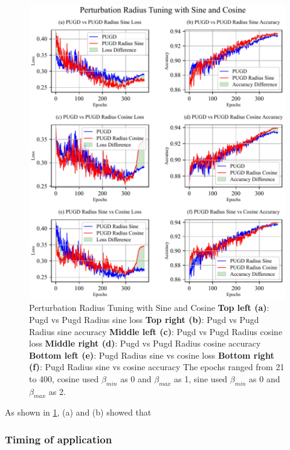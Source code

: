 \documentclass[10pt,twocolumn,letterpaper]{article}
\begin{document}
\begin{figure}[htbp]
	\center
	\vspace{-10pt} 
	\includegraphics[width=\columnwidth]{images/PUGDRadius.pdf}
	\caption{Perturbation Radius Tuning with Sine and Cosine
	\textbf{Top left (a)}: Pugd vs Pugd Radius sine loss \textbf{Top right (b)}: Pugd vs Pugd Radius sine accuracy
    \textbf{Middle left (c)}: Pugd vs Pugd Radius cosine loss \textbf{Middle right (d)}: Pugd vs Pugd Radius cosine accuracy
	\textbf{Bottom left (e)}: Pugd Radius sine vs cosine loss \textbf{Bottom right (f)}: Pugd Radius sine vs cosine accuracy
	The epochs ranged from 21 to 400, cosine used $\beta_{min}$ as 0 and $\beta_{max}$ as 1, sine used $\beta_{min}$ as 0 and $\beta_{max}$ as 2.
	}
	\label{fig:PUGDRadius}
\end{figure}

As shown in \cref{fig:PUGDRadius}, (a) and (b) showed that 



\subsubsection{Timing of application}
\label{subsec:4.1.2}
\end{document}
